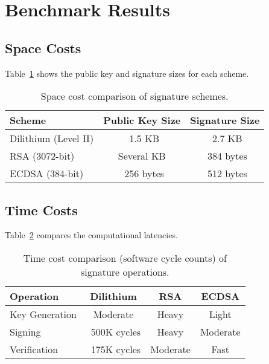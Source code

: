 \documentclass{article}
\begin{document}
\section{Benchmark Results}

\subsection{Space Costs}
Table~\ref{tab:space} shows the public key and signature sizes for each scheme.

\begin{table}[h!]
\centering
\caption{Space cost comparison of signature schemes.}
\label{tab:space}
\begin{tabular}{lcc}
\toprule
\textbf{Scheme} & \textbf{Public Key Size} & \textbf{Signature Size} \\
\midrule
Dilithium (Level II) & ~1.5 KB & ~2.7 KB \\
RSA (3072-bit) & Several KB & ~384 bytes \\
ECDSA (384-bit) & ~256 bytes & ~512 bytes \\
\bottomrule
\end{tabular}
\end{table}

\subsection{Time Costs}
Table~\ref{tab:time} compares the computational latencies.

\begin{table}[h!]
\centering
\caption{Time cost comparison (software cycle counts) of signature operations.}
\label{tab:time}
\begin{tabular}{lccc}
\toprule
\textbf{Operation} & \textbf{Dilithium} & \textbf{RSA} & \textbf{ECDSA} \\
\midrule
Key Generation & Moderate & Heavy & Light \\
Signing & ~500K cycles & Heavy & Moderate \\
Verification & ~175K cycles & Moderate & Fast \\
\bottomrule
\end{tabular}
\end{table}
\end{document}
